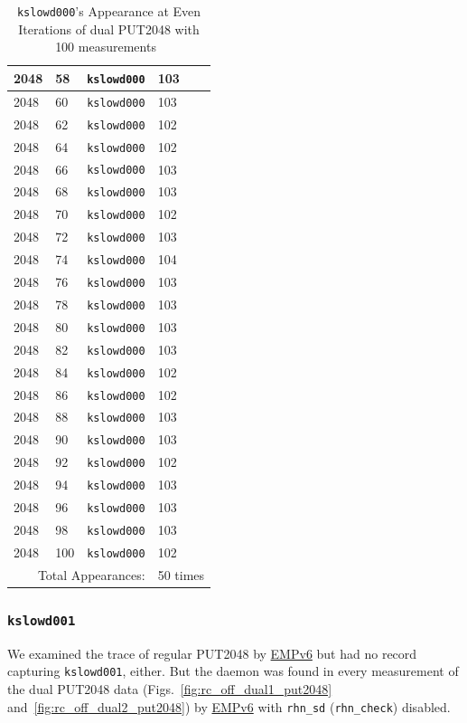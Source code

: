 \documentclass[10pt]{article}
\begin{document}
\begin{table}[htp!]
{\begin{tabular}{|l|l|l|l|}
2048 & 58 & {\tt kslowd000} & 103 \\ \hline
2048 & 60 & {\tt kslowd000} & 103 \\ \hline
2048 & 62 & {\tt kslowd000} & 102 \\ \hline
2048 & 64 & {\tt kslowd000} & 102 \\ \hline
2048 & 66 & {\tt kslowd000} & 103 \\ \hline
2048 & 68 & {\tt kslowd000} & 103 \\ \hline
2048 & 70 & {\tt kslowd000} & 102 \\ \hline
2048 & 72 & {\tt kslowd000} & 103 \\ \hline
2048 & 74 & {\tt kslowd000} & 104 \\ \hline
2048 & 76 & {\tt kslowd000} & 103 \\ \hline
2048 & 78 & {\tt kslowd000} & 103 \\ \hline
2048 & 80 & {\tt kslowd000} & 103 \\ \hline
2048 & 82 & {\tt kslowd000} & 103 \\ \hline
2048 & 84 & {\tt kslowd000} & 102 \\ \hline
2048 & 86 & {\tt kslowd000} & 102 \\ \hline
2048 & 88 & {\tt kslowd000} & 103 \\ \hline
2048 & 90 & {\tt kslowd000} & 103 \\ \hline
2048 & 92 & {\tt kslowd000} & 102 \\ \hline
2048 & 94 & {\tt kslowd000} & 103 \\ \hline
2048 & 96 & {\tt kslowd000} & 103 \\ \hline
2048 & 98 & {\tt kslowd000} & 103 \\ \hline
2048 & 100 & {\tt kslowd000} & 102 \\ \hline
\multicolumn{3}{|r|}{Total Appearances:} & 50 times\\ \hline
  \end{tabular}
  }
 \caption{{\tt kslowd000}'s Appearance at Even Iterations of dual PUT2048 with 100 measurements~\label{fig:rc_dual_put_2048_even}}
\end{table}

\clearpage
\newpage

\subsubsection{{\tt kslowd001}} 
We examined the trace of regular PUT2048 by \underline{EMPv6} 
but had no record capturing {\tt kslowd001}, either. 
But the daemon was found in 
every measurement of the dual PUT2048 data (Figs.~\ref{fig:rc_off_dual1_put2048} and~\ref{fig:rc_off_dual2_put2048}) by \underline{ EMPv6} with {\tt rhn\_sd} ({\tt rhn\_check}) disabled.
\end{document}
